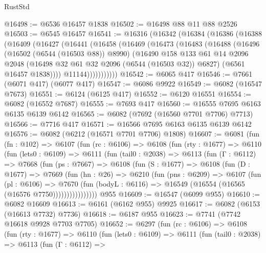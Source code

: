 \begin{lexlean}{RustStd}
\begin{coremodule}
@16498 := @6536 @16457 @1838
@16502 := @16498 @88 @11 @88 @2526
@16503 := @6545 @16457
@16541 := @16316
    (@16342
      (@16384
        (@16386
          (@16388
            (@16409
              (@16427
                (@16441
                  (@16458
                    (@16469
                      (@16473
                        (@16483
                          (@16488
                            (@16496
                              (@16502 (@6544 (@16503 @88)) @8990)
                              (@16490
                                @158
                                @133
                                @61
                                @14
                                @2096
                                @2048
                                (@16498 @32 @61 @32 @2096 (@6544 (@16503 @32)) @6827)
                                (@6561 @16457 @1838))))
                          @11144)))))))))))
@16542 := @6065 @417
@16546 := @7661 (@6071 @417) (@6077 @417)
@16547 := @6086 @9922
@16549 := @6082 (@16547 @7673)
@16551 := @6124 (@6125 @417)
@16552 := @6120 @16551
@16554 := @6082 (@16552 @7687)
@16555 := @7693 @417
@16560 := @16555 @7695 @6163 @6135 @6139 @6142
@16565 := @6082 (@7692 (@16560 @7701 @7706) @7713)
@16566 := @7716 @417
@16571 := @16566 @7695 @6163 @6135 @6139 @6142
@16576 := @6082 (@6212 (@16571 @7701 @7706) @1808)
@16607 := @6081
    (fun (fn : @102) =>
    @6107
      (fun (rc : @6106) =>
      @6108
        (fun (rty : @1677) =>
        @6110
          (fun (lets0 : @6109) =>
          @6111
            (fun (tail0 : @2038) =>
            @6113
              (fun (Γ : @6112) =>
              @7668
                (fun (ps : @7667) =>
                @6108
                  (fun (S : @1677) =>
                  @6108
                    (fun (D : @1677) =>
                    @7669
                      (fun (hn : @26) =>
                      @6210
                        (fun (pns : @6209) =>
                        @6107
                          (fun (pl : @6106) =>
                          @7670
                            (fun (bodyL : @6116) =>
                            @16549 (@16554 (@16565 (@16576 @7750))))))))))))))))
    @955
@16609 := @16547 (@6099 @955)
@16610 := @6082 @16609
@16613 := @6161 (@6162 @955) @9925
@16617 := @6082 (@6153 (@16613 @7732) @7736)
@16618 := @6187 @955
@16623 := @7741 (@7742 @16618 @9928 @7703 @7705)
@16652 := @6297
    (fun (rc : @6106) =>
    @6108
      (fun (rty : @1677) =>
      @6110
        (fun (lets0 : @6109) =>
        @6111
          (fun (tail0 : @2038) =>
          @6113
            (fun (Γ : @6112) =>

\end{coremodule}
\end{lexlean}
